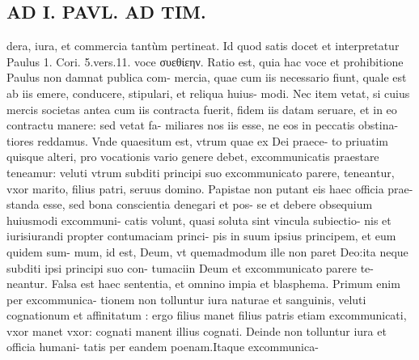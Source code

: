 \documentclass{article}
\begin{document}
\begin{pages}
\section*{AD I. PAVL. AD TIM. }
\marginpar{[ p.400 ]}\pstart dera, iura, et commercia tantùm pertineat. Id quod satis docet et interpretatur Paulus 1. Cori. 5.vers.11. voce συεθίεην. Ratio est, quia hac voce et prohibitione Paulus non damnat publica com- mercia, quae cum iis necessario fiunt, quale est ab iis emere, conducere, stipulari, et reliqua huius- modi. Nec item vetat, si cuius mercis societas antea cum iis contracta fuerit, fidem iis datam seruare, et in eo contractu manere: sed vetat fa- miliares nos iis esse, ne eos in peccatis obstina- tiores reddamus.  \pend\pstart Vnde quaesitum est, vtrum quae ex Dei praece- to priuatim quisque alteri, pro vocationis vario genere debet, excommunicatis praestare teneamur: veluti vtrum subditi principi suo excommunicato parere, teneantur, vxor marito, filius patri, seruus domino. Papistae non putant eis haec officia prae- standa esse, sed bona conscientia denegari et pos- se et debere obsequium huiusmodi excommuni- catis volunt, quasi soluta sint vincula subiectio- nis et iurisiurandi propter contumaciam princi- pis in suum ipsius principem, et eum quidem sum- mum, id est, Deum, vt quemadmodum ille non paret Deo:ita neque subditi ipsi principi suo con- tumaciin Deum et excommunicato parere te- neantur. Falsa est haec sententia, et omnino impia et blasphema. Primum enim per excommunica- tionem non tolluntur iura naturae et sanguinis, veluti cognationum et affinitatum : ergo filius manet filius patris etiam excommunicati, vxor manet vxor: cognati manent illius cognati.  \pend\pstart Deinde non tolluntur iura et officia humani- tatis per eandem poenam.Itaque excommunica-  \pend

\end{pages}
\end{document}

